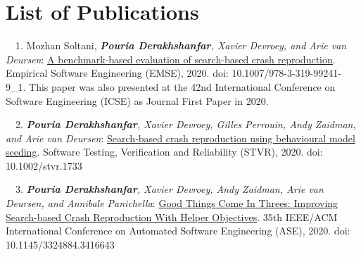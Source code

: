 \chapter*{List of Publications}
\label{publications}



\begin{etaremune}{\small
    \item[\faFileTextO~~1.] Mozhan Soltani, \emph{\textbf{Pouria Derakhshanfar}, Xavier Devroey, and Arie van Deursen}: 
    \href{http://pure.tudelft.nl/ws/portalfiles/portal/66657023/Soltani2019_Article_ABenchmark_basedEvaluationOfSe.pdf}{A benchmark-based evaluation of search-based crash reproduction}.
    Empirical Software Engineering (EMSE),
    2020. doi: 10.1007/978-3-319-99241-9\_1. 
    This paper was also presented at the 42nd International Conference on Software Engineering (ICSE) as Journal First Paper in 2020. 
}\end{etaremune}

\begin{etaremune}{\small
    \item[\faFileTextO~~2.] \emph{\textbf{Pouria Derakhshanfar}, Xavier Devroey, Gilles Perrouin,  Andy Zaidman, and Arie van Deursen}: 
        \href{https://onlinelibrary.wiley.com/doi/epdf/10.1002/stvr.1733}{Search‐based crash reproduction using behavioural model seeding}.
        Software Testing, Verification and Reliability (STVR),
        2020. doi: 10.1002/stvr.1733
}\end{etaremune}

\begin{etaremune}{\small
    \item[\faFileTextO~~3.] \emph{\textbf{Pouria Derakhshanfar}, Xavier Devroey,  Andy Zaidman, Arie van Deursen, and Annibale Panichella}: 
        \href{https://research.tudelft.nl/en/publications/good-things-come-in-threes-improving-search-based-crash-reproduct}{Good Things Come In Threes: Improving Search-based Crash Reproduction With Helper Objectives}.
        35th IEEE/ACM International Conference on Automated Software Engineering (ASE),
        2020. doi: 10.1145/3324884.3416643
}\end{etaremune}


